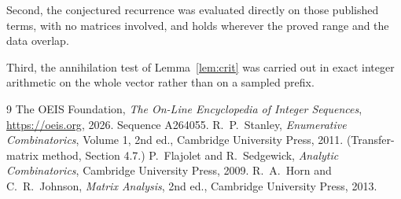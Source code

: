 \documentclass[11pt,a4paper]{article}
\theoremstyle{plain}
\theoremstyle{definition}
\begin{document}
Second, the conjectured recurrence was evaluated directly on those published terms, with no
matrices involved, and holds wherever the proved range and the data overlap.

Third, the annihilation test of Lemma~\ref{lem:crit} was carried out in exact integer
arithmetic on the whole vector rather than on a sampled prefix.

\begin{thebibliography}{9}
 The OEIS Foundation, \emph{The On-Line Encyclopedia of Integer
Sequences}, \url{https://oeis.org}, 2026. Sequence A264055.
 R.~P.~Stanley, \emph{Enumerative Combinatorics}, Volume 1, 2nd ed.,
Cambridge University Press, 2011. (Transfer-matrix method, Section 4.7.)
 P.~Flajolet and R.~Sedgewick, \emph{Analytic Combinatorics}, Cambridge
University Press, 2009.
 R.~A.~Horn and C.~R.~Johnson, \emph{Matrix Analysis}, 2nd ed., Cambridge
University Press, 2013.
\end{thebibliography}
\end{document}
